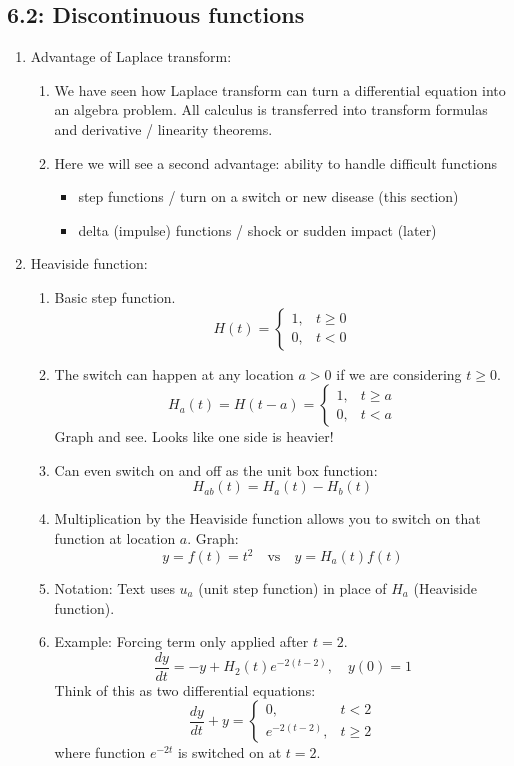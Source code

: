 \documentclass{article}
\begin{document}
\subsection{6.2: Discontinuous functions}

\begin{enumerate}

\item Advantage of Laplace transform:
\begin{enumerate}
\item We have seen how Laplace transform can turn a differential equation into an algebra problem. All calculus is transferred into transform formulas and derivative / linearity theorems.
\item Here we will see a second advantage: ability to handle difficult functions 
\begin{itemize}
\item step functions / turn on a switch or new disease (this section) 
\item delta (impulse) functions / shock or sudden impact (later)
\end{itemize}
\end{enumerate}

\item Heaviside function: 
\begin{enumerate}
\item Basic step function.
\[
H(t) = \begin{cases}
1, & t \geq 0 \\
0, & t< 0
\end{cases}
\]
\item The switch can happen at any location $a>0$ if we are considering $t\geq 0$.
\[
H_a(t) = H(t-a) = \begin{cases}
1, & t \geq a \\
0, & t< a
\end{cases}
\]
Graph and see. Looks like one side is heavier!
\item Can even switch on and off as the unit box function:
\[
H_{ab}(t) = H_a(t) - H_b(t) 
\]
\item Multiplication by the Heaviside function allows you to switch on that function at location $a$. Graph:
\[
y=f(t) = t^2 \quad \text{vs} \quad y=H_a(t)f(t)
\]
\item Notation: Text uses $u_a$ (unit step function) in place of $H_a$ (Heaviside function). 
\item Example: Forcing term only applied after $t=2$. 
\[
\frac{dy}{dt} = -y+H_2(t)e^{-2(t-2)}, \quad y(0)=1
\]
Think of this as two differential equations:
\[
\frac{dy}{dt}+y =
\begin{cases}
0, &t<2 \\
e^{-2(t-2)}, & t\geq 2
\end{cases}
\]
where function $e^{-2t}$ is switched on at $t=2$.
\end{enumerate}


\end{enumerate}
\end{document}
